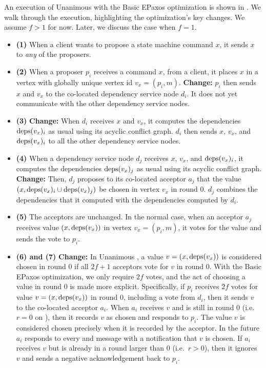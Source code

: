 An execution of Unanimous \BPaxos{} with the Basic EPaxos optimization is shown
in . We walk through the execution, highlighting the
optimization's key changes. We assume $f > 1$ for now. Later, we discuss the
case when $f = 1$.
\begin{itemize}
  \item \textbf{(1)}
    When a client wants to propose a state machine command $x$, it sends $x$ to
    \emph{any} of the proposers.

  \item \textbf{(2)}
    When a proposer $p_i$ receives a command $x$, from a client, it places $x$
    in a vertex with globally unique vertex id $v_x = (p_i, m)$.
    \textbf{Change:} $p_i$ then sends $x$ and $v_x$ to the co-located
    dependency service node $d_i$. It does not yet communicate with the other
    dependency service nodes.

  \item \textbf{(3)}
    \textbf{Change:} When $d_i$ receives $x$ and $v_x$, it computes the
    dependencies $\text{deps}(v_x)_i$ as usual using its acyclic conflict graph.
    $d_i$ then sends $x$, $v_x$, and $\text{deps}(v_x)_i$ to all the other dependency
    service nodes.

  \item \textbf{(4)}
    When a dependency service node $d_j$ receives $x$, $v_x$, and
    $\text{deps}(v_x)_i$, it computes the dependencies $\text{deps}(v_x)_j$ as usual using
    its acyclic conflict graph. \textbf{Change:} Then, $d_j$ proposes to its
    co-located acceptor $a_j$ that the value $(x, \text{deps}(v_x)_i \cup
    \text{deps}(v_x)_j)$ be chosen in vertex $v_x$ in round $0$. $d_j$ combines the
    dependencies that it computed with the dependencies computed by $d_i$.

  \item \textbf{(5)}
    The acceptors are unchanged. In the normal case, when an acceptor $a_j$
    receives value $(x, \text{deps}(v_x))$ in vertex $v_x = (p_i, m)$, it votes for
    the value and sends the vote to $p_i$.

  \item \textbf{(6) and (7)}
    \textbf{Change:} In Unanimous \BPaxos{}, a value $v = (x, \text{deps}(v_x))$ is
    considered chosen in round $0$ if all $2f+1$ acceptors vote for $v$ in
    round $0$. With the Basic EPaxos optimization, we only require $2f$ votes,
    and the act of choosing a value in round $0$ is made more explicit.
    Specifically, if $p_i$ receives $2f$ votes for value $v = (x, \text{deps}(v_x))$
    in round $0$, including a vote from $d_i$, then it sends $v$ to the
    co-located acceptor $a_i$. When $a_i$ receives $v$ and is still in round
    $0$ (i.e.\ $r = 0$ on  ),
    then it records $v$ as chosen and responds to $p_i$. The value $v$ is
    considered chosen precisely when it is recorded by the acceptor. In the
    future $a_i$ responds to every  and 
    message with a notification that $v$ is chosen. If $a_i$ receives $v$ but
    is already in a round larger than $0$ (i.e.\ $r > 0$), then it ignores $v$
    and sends a negative acknowledgement back to $p_i$.


\end{itemize}
